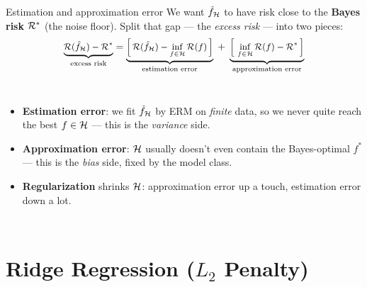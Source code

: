\documentclass[aspectratio=169]{beamer}
\begin{document}
\begin{frame}{Estimation and approximation error}
  We want $\hat{f}_{\mathcal{H}}$ to have risk close to the \textbf{Bayes risk} $\mathcal{R}^*$ (the noise floor). Split that gap --- the \emph{excess risk} --- into two pieces:
  \[
    \small
    \underbrace{\mathcal{R}(\hat{f}_{\mathcal{H}}) - \mathcal{R}^*}_{\text{excess risk}}
    = \underbrace{\Big[\,\mathcal{R}(\hat{f}_{\mathcal{H}}) - \inf_{f\in\mathcal{H}}\mathcal{R}(f)\,\Big]}_{\text{estimation error}}
    \; + \;
    \underbrace{\Big[\,\inf_{f\in\mathcal{H}}\mathcal{R}(f) - \mathcal{R}^*\,\Big]}_{\text{approximation error}}
  \]
  \begin{columns}[T]
    \centering
    \footnotesize
    \begin{itemize}
      \item \textbf{Estimation error}: we fit $\hat{f}_{\mathcal{H}}$ by ERM on \emph{finite} data, so we never quite reach the best $f \in \mathcal{H}$ --- this is the \emph{variance} side.
      \item \textbf{Approximation error}: $\mathcal{H}$ usually doesn't even contain the Bayes-optimal $f^*$ --- this is the \emph{bias} side, fixed by the model class.
      \item \textbf{Regularization} shrinks $\mathcal{H}$: approximation error up a touch, estimation error down a lot.
    \end{itemize}
  \end{columns}
\end{frame}

\section{Ridge Regression (\texorpdfstring{$L_2$}{L2} Penalty)}
\end{document}
